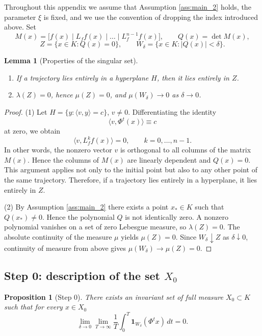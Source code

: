 \documentclass[11pt]{article}
\newcommand{\dd}{\,d}
\theoremstyle{thmstyleone}
\newtheorem{proposition}[theorem]{Proposition}
\newtheorem{lemma}[theorem]{Lemma}
\theoremstyle{thmstyletwo}
\theoremstyle{thmstylethree}
\begin{document}
\begin{appendices}
Throughout this appendix we assume that Assumption \ref{ass:main_2} holds, the parameter $\xi$ is fixed, and we use the convention of dropping the index introduced above. Set
\[
    M(x)=\bigl[f(x)\mid L_f f(x)\mid\dots\mid L_f^{n-1}f(x)\bigr],
    \qquad
    Q(x)=\det M(x),
\]
\[
    Z=\{x\in K:Q(x)=0\},
    \qquad
    W_\delta=\{x\in K:|Q(x)|<\delta\}.
\]

\begin{lemma}[Properties of the singular set]
\label{lem:singular}\label{lem:singular_set_2}
\begin{enumerate}
    \item If a trajectory lies entirely in a hyperplane $H$, then it lies entirely in $Z$.
    \item $\lambda(Z)=0$, hence $\mu(Z)=0$, and $\mu(W_\delta)\to0$ as $\delta\to0$.
\end{enumerate}
\end{lemma}

\begin{proof}
(1) Let $H=\{y:\langle v,y\rangle=c\}$, $v\ne0$. Differentiating the identity
\[
    \langle v,\Phi^t(x)\rangle\equiv c
\]
at zero, we obtain
\[
    \langle v,L_f^k f(x)\rangle=0,
    \qquad k=0,\dots,n-1.
\]
In other words, the nonzero vector $v$ is orthogonal to all columns of the matrix $M(x)$. Hence the columns of $M(x)$ are linearly dependent and $Q(x)=0$. This argument applies not only to the initial point but also to any other point of the same trajectory. Therefore, if a trajectory lies entirely in a hyperplane, it lies entirely in $Z$.

(2) By Assumption \ref{ass:main_2} there exists a point $x_*\in K$ such that $Q(x_*)\ne0$. Hence the polynomial $Q$ is not identically zero. A nonzero polynomial vanishes on a set of zero Lebesgue measure, so $\lambda(Z)=0$. The absolute continuity of the measure $\mu$ yields $\mu(Z)=0$. Since $W_\delta\downarrow Z$ as $\delta\downarrow0$, continuity of measure from above gives $\mu(W_\delta)\to\mu(Z)=0$.
\end{proof}

\subsection*{Step 0: description of the set $X_0$}



\begin{proposition}[Step 0]
\label{prop:step0_X0_2}
There exists an invariant set of full measure $X_0\subset K$ such that for every $x\in X_0$
\begin{equation}\label{eq:step0_X0_2}
    \lim_{\delta\to0}\lim_{T\to\infty}
    \frac1T\int_0^T\mathbf 1_{W_\delta}(\Phi^t x)\dd t=0.
\end{equation}
\end{proposition}


\end{appendices}
\end{document}
